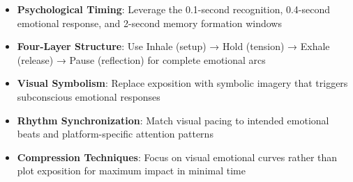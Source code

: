 \begin{itemize}
\item \textbf{Psychological Timing}: Leverage the 0.1-second recognition, 0.4-second emotional response, and 2-second memory formation windows
\item \textbf{Four-Layer Structure}: Use Inhale (setup) → Hold (tension) → Exhale (release) → Pause (reflection) for complete emotional arcs
\item \textbf{Visual Symbolism}: Replace exposition with symbolic imagery that triggers subconscious emotional responses
\item \textbf{Rhythm Synchronization}: Match visual pacing to intended emotional beats and platform-specific attention patterns
\item \textbf{Compression Techniques}: Focus on visual emotional curves rather than plot exposition for maximum impact in minimal time
\end{itemize}
